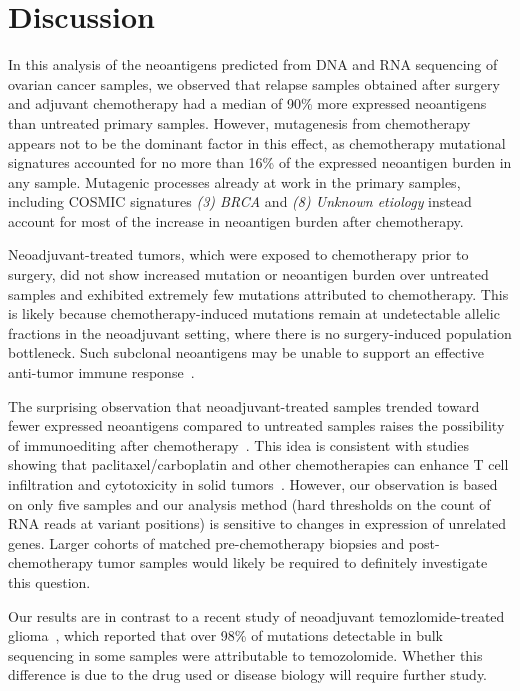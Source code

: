 \section*{Discussion}
In this analysis of the neoantigens predicted from DNA and RNA sequencing of ovarian cancer samples, we observed that relapse samples obtained after surgery and adjuvant chemotherapy had a median of 90\% more expressed neoantigens than untreated primary samples. However, mutagenesis from chemotherapy appears not to be the dominant factor in this effect, as chemotherapy mutational signatures accounted for no more than 16\% of the expressed neoantigen burden in any sample. Mutagenic processes already at work in the primary samples, including COSMIC signatures \textit{(3) BRCA} and \textit{(8) Unknown etiology} instead account for most of the increase in neoantigen burden after chemotherapy.

Neoadjuvant-treated tumors, which were exposed to chemotherapy prior to surgery, did not show increased mutation or neoantigen burden over untreated samples and exhibited extremely few mutations attributed to chemotherapy. This is likely because chemotherapy-induced mutations remain at undetectable allelic fractions in the neoadjuvant setting, where there is no surgery-induced population bottleneck. Such subclonal neoantigens may be unable to support an effective anti-tumor immune response~\cite{McGranahan_2016}.

The surprising observation that neoadjuvant-treated samples trended toward fewer expressed neoantigens compared to untreated samples raises the possibility of immunoediting after chemotherapy~\cite{Dunn_2002}. This idea is consistent with studies showing that paclitaxel/carboplatin and other chemotherapies can enhance T cell infiltration and cytotoxicity in solid tumors~\cite{Demaria2001,Wu_2009,Pfannenstiel_2010,Hodge_2013}. However, our observation is based on only five samples and our analysis method (hard thresholds on the count of RNA reads at variant positions) is sensitive to changes in expression of unrelated genes. Larger cohorts of matched pre-chemotherapy biopsies and post-chemotherapy tumor samples would likely be required to definitely investigate this question.

Our results are in contrast to a recent study of neoadjuvant temozlomide-treated glioma~\cite{Johnson_2013}, which reported that over 98\% of mutations detectable in bulk sequencing in some samples were attributable to temozolomide. Whether this difference is due to the drug used or disease biology will require further study.

